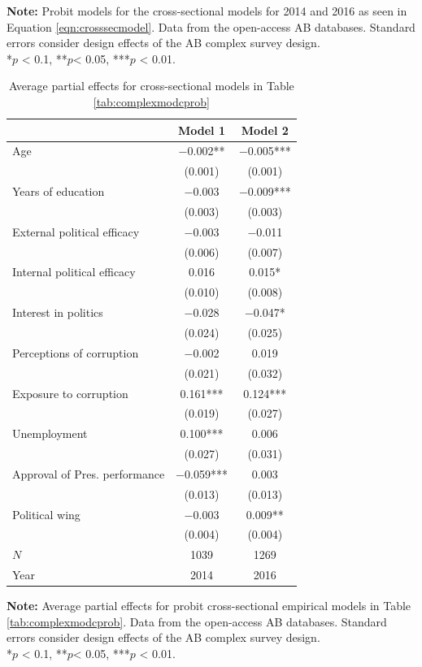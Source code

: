 \documentclass[12pt,a4]{article}\usepackage[]{graphicx}\usepackage[]{xcolor}
\begin{document}
\begin{table}[htbp]
\begin{center}
\end{center}
\textbf{Note:} Probit models for the cross-sectional models for 2014 and 2016 as seen in Equation \ref{eqn:crosssecmodel}. Data from the open-access AB databases. Standard errors consider design effects of the AB complex survey design.\\
*$p$ < 0.1, **$p$< 0.05, ***$p$ < 0.01.
\end{table}

\begin{table}[htbp]
\begin{center}
\caption{Average partial effects for cross-sectional models in Table \ref{tab:complexmodcprob}}
\label{tab:apecrossprobit}

\begin{tabular}[t]{lcc}
\toprule
  & Model 1 & Model 2\\
\midrule
Age & \num{-0.002}** & \num{-0.005}***\\
 & (\num{0.001}) & (\num{0.001})\\
Years of education & \num{-0.003} & \num{-0.009}***\\
 & (\num{0.003}) & (\num{0.003})\\
External political efficacy & \num{-0.003} & \num{-0.011}\\
 & (\num{0.006}) & (\num{0.007})\\
Internal political efficacy & \num{0.016} & \num{0.015}*\\
 & (\num{0.010}) & (\num{0.008})\\
Interest in politics & \num{-0.028} & \num{-0.047}*\\
 & (\num{0.024}) & (\num{0.025})\\
Perceptions of corruption & \num{-0.002} & \num{0.019}\\
 & (\num{0.021}) & (\num{0.032})\\
Exposure to corruption & \num{0.161}*** & \num{0.124}***\\
 & (\num{0.019}) & (\num{0.027})\\
Unemployment & \num{0.100}*** & \num{0.006}\\
 & (\num{0.027}) & (\num{0.031})\\
Approval of Pres. performance & \num{-0.059}*** & \num{0.003}\\
 & (\num{0.013}) & (\num{0.013})\\
Political wing & \num{-0.003} & \num{0.009}**\\
 & (\num{0.004}) & (\num{0.004})\\
\midrule
$N$ & \num{1039} & \num{1269}\\
Year & 2014 & 2016\\
\bottomrule
\end{tabular}


\end{center}
\textbf{Note:} Average partial effects for probit cross-sectional empirical models in Table \ref{tab:complexmodcprob}. Data from the open-access AB databases. Standard errors consider design effects of the AB complex survey design.\\
*$p$ < 0.1, **$p$< 0.05, ***$p$ < 0.01.
\end{table}
\end{document}
